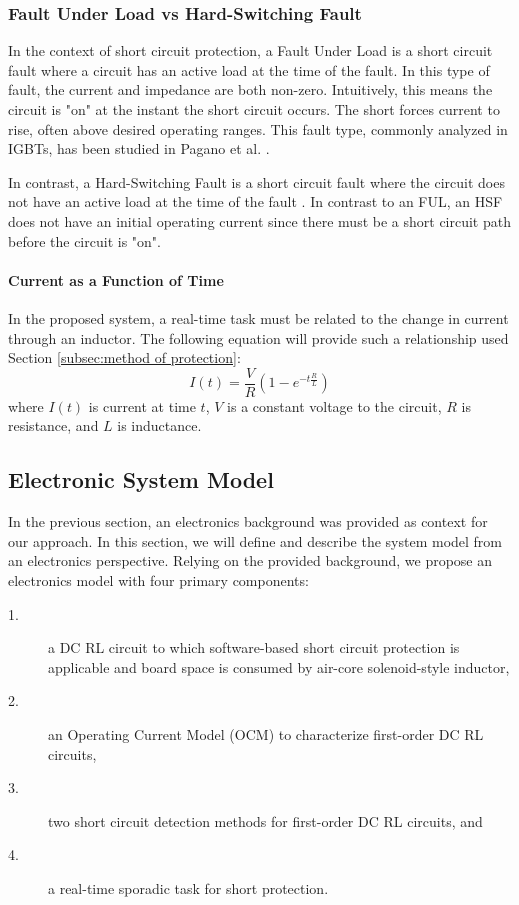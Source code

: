 \subsubsection{Fault Under Load vs Hard-Switching Fault}
In the context of short circuit protection, a Fault Under Load is a short circuit fault where a circuit has an active load at the time of the fault.
In this type of fault, the current and impedance are both non-zero.
Intuitively, this means the circuit is "on" at the instant the short circuit occurs.
The short forces current to rise, often above desired operating ranges.
This fault type, commonly analyzed in IGBTs, has been studied in Pagano et al. \cite{pagano_short_2005}.

In contrast, a Hard-Switching Fault is a short circuit fault where the circuit does not have an active load at the time of the fault \cite{horiguchi_high-speed_2015}.
In contrast to an FUL, an HSF does not have an initial operating current since there must be a short circuit path before the circuit is "on".

\paragraph{Current as a Function of Time}
In the proposed system, a real-time task must be related to the change in current through an inductor.
The following equation will provide such a relationship used Section \ref{subsec:method of protection}:
\begin{equation}\label{eq:CurrentAtTime}
I(t) = \frac{V}{R}(1-e^{-t \frac{R}{L}})
\end{equation}
where $I(t)$ is current at time $t$, $V$ is a constant voltage to the circuit, $R$ is resistance, and $L$ is inductance.
\clearpage \subsection{Electronic System Model}\label{subsec:electronic system model}
In the previous section, an electronics background was provided as context for our approach.
In this section, we will define and describe the system model from an electronics perspective.
Relying on the provided background, we propose an electronics model with four primary components:
\begin{description}
\item [1.] a DC RL circuit to which software-based short circuit protection is applicable and board space is consumed by air-core solenoid-style inductor,
\item [2.] an Operating Current Model (OCM) to characterize first-order DC RL circuits,
\item [3.] two short circuit detection methods for first-order DC RL circuits, and
\item [4.] a real-time sporadic task for short protection.
\end{description}

